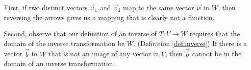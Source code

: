 \documentclass{ximera}
\begin{document}
 First, if two distinct vectors $\vec{v}_1$ and $\vec{v}_2$ map to the same vector $\vec{w}$ in $W$, then reversing the arrows gives us a mapping that is clearly not a function. %
 
\begin{center}
\end{center}

Second, observe that our definition of an inverse of $T:V\rightarrow W$ requires that the domain of the inverse transformation be $W$. (Definition \ref{def:inverse})  If there is a vector $\vec{b}$ in $W$ that is not an image of any vector in $V$, then $\vec{b}$ cannot be in the domain of an inverse transformation. %

\begin{center}
  \label{fig:notonto} 
\end{center}
\end{document}
